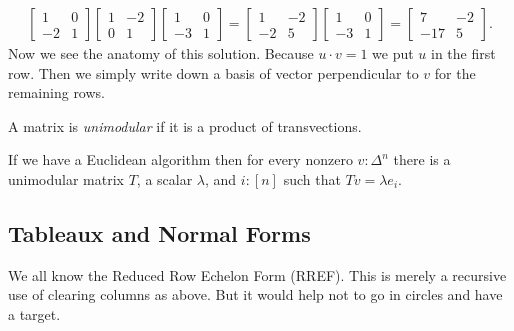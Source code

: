 \documentclass[12pt,twoside,dvipsnames,letterpaper]{memoir}
\begin{document}
\begin{align*}
    \begin{bmatrix}
        1 & 0 \\
        -2 & 1
    \end{bmatrix}    
    \begin{bmatrix}
        1 & -2 \\
        0 & 1
    \end{bmatrix}    
    \begin{bmatrix}
        1 & 0 \\
        -3 & 1
    \end{bmatrix}    
    = 
    \begin{bmatrix}
        1 & -2\\
        -2 & 5
    \end{bmatrix}
    \begin{bmatrix}
        1 & 0 \\
        -3 & 1
    \end{bmatrix} 
    =
    \begin{bmatrix}
        7 & -2\\
        -17 & 5   
    \end{bmatrix}.
\end{align*}
Now we see the anatomy of this solution.  Because $u\cdot v=1$
we put $u$ in the first row.  Then we simply write down a basis 
of vector perpendicular to $v$ for the remaining rows.

\begin{definition}
    A matrix is \emph{unimodular} if it is a product 
    of transvections.  
\end{definition}

\begin{proposition}
    If we have a Euclidean algorithm then 
    for every nonzero $v:\Delta^n$ there is a 
    unimodular matrix $T$, a scalar $\lambda$,
    and $i:[n]$ such that $Tv=\lambda e_i$.
\end{proposition}

\subsection{Tableaux and Normal Forms}
We all know the Reduced Row Echelon Form (RREF).  
This is merely a recursive use of clearing columns as above.
But it would help not to go in circles and have a target.
\end{document}
